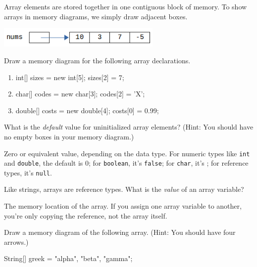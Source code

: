
Array elements are stored together in one contiguous block of memory. To show arrays in memory diagrams, we simply draw adjacent boxes.

\begin{center}

\vspace{1ex}
\includegraphics[width=225pt]{array-diagram1.png}
\end{center}




\Q Draw a memory diagram for the following array declarations.

\begin{enumerate}

\item
\begin{javalst}
int[] sizes = new int[5];
sizes[2] = 7;
\end{javalst}

\item
\begin{javalst}
char[] codes = new char[3];
codes[2] = 'X';
\end{javalst}

\item
\begin{javalst}
double[] costs = new double[4];
costs[0] = 0.99;
\end{javalst}

\end{enumerate}


\Q What is the \emph{default} value for uninitialized array elements? (Hint: You should have no empty boxes in your memory diagram.)

\begin{answer}
Zero or equivalent value, depending on the data type.
For numeric types like {\tt int} and {\tt double}, the default is 0; for {\tt boolean}, it's {\tt false}; for {\tt char}, it's {\tt {}\qs}; for reference types, it's {\tt null}.
\end{answer}


\Q Like strings, arrays are reference types. What is the \emph{value} of an array variable?

\begin{answer}
The memory location of the array. If you assign one array variable to another, you're only copying the reference, not the array itself.
\end{answer}


\Q Draw a memory diagram of the following array.
(Hint: You should have four arrows.)

\begin{javalst}
String[] greek = {"alpha", "beta", "gamma"};
\end{javalst}

\begin{answer}
\end{answer}
